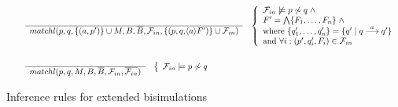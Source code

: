 \begin{figure}
\[\begin{array}{r@{\;\;}c@{\;\;\;\;}l}
& &
\myfrac{}{matchl(p,q,\{(a,p')\}\cup M,B,\overline{B},{\cal F}_{in},\{(p,q,\can{a}F')\}\cup{\cal F}_{in})}
\;\;\;\left\{
\begin{array}{l}
{\cal F}_{in}\not\models p\not\sim q\;\wedge\\
F'=\bigwedge\{F_1,\ldots,F_n\}\;\wedge\\
\mbox{where }\{q'_1,\ldots,q'_n\}=\{q'\mid q\der{a}q'\}\\
\mbox{and }\forall i:(p',q'_i,F_i)\in{\cal F}_{in}
\end{array}
\right.\\
\\[.5\baselineskip]
& &
\myfrac{}{matchl(p,q,M,B,\overline{B},{\cal F}_{in},\overline{{\cal F}_{in}})}
\;\;\;\left\{
\begin{array}{l}
{\cal F}_{in}\models p\not\sim q\\
\end{array}
\right.\\

\end{array}
\]
\endgroup\caption{Inference rules for extended bisimulations\label{figExtBisI}}
\end{figure}
